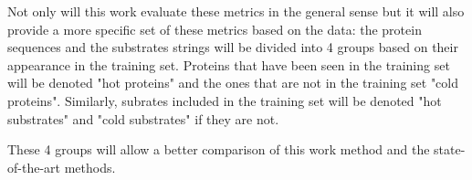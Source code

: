 Not only will this work evaluate these metrics in the general sense but it will also provide a more specific
set of these metrics based on the data: the protein sequences and the substrates strings will be divided into
4 groups based on their appearance in the training set. Proteins that have been seen in the training set
will be denoted "hot proteins" and the ones that are not in the training set "cold proteins". Similarly, 
subrates included in the training set will be denoted "hot substrates" and "cold substrates" if they
are not.

These 4 groups will allow a better comparison of this work method and the state-of-the-art methods.

